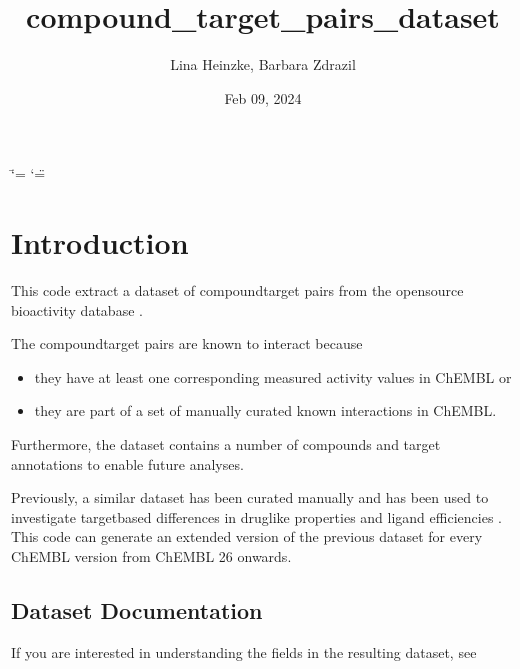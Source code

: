 \documentclass[letterpaper,10pt,english]{sphinxmanual}
\title{compound\_target\_pairs\_dataset}
\date{Feb 09, 2024}
\author{Lina Heinzke, Barbara Zdrazil}
\begin{document}
\ifdefined\shorthandoff
  \ifnum\catcode`\=\string=\active\shorthandoff{=}\fi
  \ifnum\catcode`\"=\active{}\fi
\fi

\pagestyle{empty}
\sphinxmaketitle
\pagestyle{plain}
\sphinxtableofcontents
\pagestyle{normal}
\label{\detokenize{index::doc}}


\sphinxstepscope


\chapter{Introduction}
\label{\detokenize{introduction:introduction}}\label{\detokenize{introduction::doc}}
\sphinxAtStartPar
This code extract a dataset of compound\sphinxhyphen{}target pairs from the open\sphinxhyphen{}source bioactivity database  .

\sphinxAtStartPar
The compound\sphinxhyphen{}target pairs are known to interact because
\begin{itemize}
\item {} 
\sphinxAtStartPar
they have at least one corresponding measured activity values in ChEMBL or

\item {} 
\sphinxAtStartPar
they are part of a set of manually curated known interactions in ChEMBL.

\end{itemize}

\sphinxAtStartPar
Furthermore, the dataset contains a number of compounds and target annotations to enable future analyses.

\sphinxAtStartPar
Previously, a similar dataset has been curated manually and has been used to investigate target\sphinxhyphen{}based differences in drug\sphinxhyphen{}like properties and ligand efficiencies .
This code can generate an extended version of the previous dataset for every ChEMBL version from ChEMBL 26 onwards.


\section{Dataset Documentation}
\label{\detokenize{introduction:dataset-documentation}}
\sphinxAtStartPar
If you are interested in understanding the fields in the resulting dataset, see {\hyperref[\detokenize{columns_docs::doc}]{}}
\end{document}
